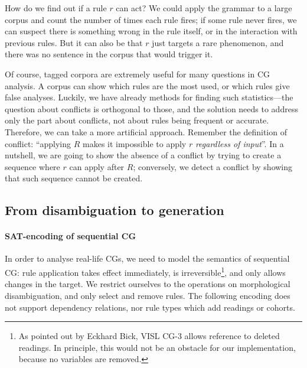 How do we find out if a rule $r$ can act? 
We could apply the grammar to a large corpus and count the number of times 
each rule fires; if some rule never fires, we can suspect there is something wrong 
in the rule itself, or in the interaction with previous rules. 
But it can also be that $r$ just targets a rare phenomenon, and there was no sentence in the corpus that would trigger it.

Of course, tagged corpora are extremely useful for many questions in CG analysis.
A corpus can show which rules are the most used, or which rules give false analyses. 
Luckily, we have already methods for finding such statistics---the question 
about conflicts is orthogonal to those, and the solution needs to address only 
the part about conflicts, not about rules being frequent or accurate.
Therefore, we can take a more artificial approach. %
Remember the definition of conflict: ``applying $R$ makes it impossible to apply $r$ \emph{regardless of input}''.
In a nutshell, we are going to show the absence of a conflict by trying to create 
a sequence where $r$ can apply after $R$; conversely, we detect a conflict by 
showing that such sequence cannot be created.




\def\newVar{$\text{\em word}'_\textsc{ RD}$}
\def\oldVar{$\text{\em word}_\textsc{\,RD}$}
\def\eqdef{\Coloneqq}
\def\invConds{\text{invalid condition}}
\def\onlyTrgLeft{\text{only target left}}

\subsection{From disambiguation to generation}

\paragraph{SAT-encoding of sequential CG}
\label{sec:orderedScheme}

In order to analyse real-life CGs, we need to model the semantics of sequential CG: 
rule application takes effect immediately, is irreversible\footnote{As pointed out by Eckhard Bick, VISL CG-3 allows reference to deleted readings. In principle, this would not be an obstacle for our implementation, because no variables are removed.}, and only allows changes in the target.
We restrict ourselves to the operations on morphological disambiguation, and only {\sc select} and {\sc remove} rules. 
The following encoding does not support dependency relations, nor rule types which add readings or cohorts. 


